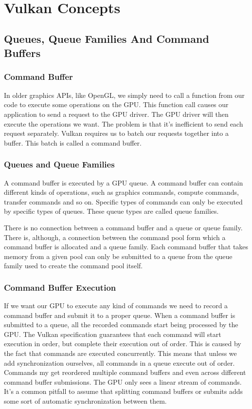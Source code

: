 \chapter{Vulkan Concepts}

\section{Queues, Queue Families And Command Buffers}

\subsection{Command Buffer}

In older graphics APIs, like OpenGL, we simply need to call a function
from our code to execute some operations on the GPU.
This function call causes our application to send a request to the GPU driver.
The GPU driver will then execute the operations we want.
The problem is that it's inefficient to send each request separately.
Vulkan requires us to batch our requests together into a buffer.
This batch is called a command buffer.

\subsection{Queues and Queue Families}

A command buffer is executed by a GPU queue.
A command buffer can contain different kinds of operations, such as graphics
commands, compute commands, transfer commands and so on.
Specific types of commands can only be executed by specific types of queues.
These queue types are called queue families.

There is no connection between a command buffer and a queue or queue family.
There is, although, a connection between the command pool form which a command
buffer is allocated and a queue family.
Each command buffer that takes memory from a given pool can only be submitted
to a queue from the queue family used to create the command pool itself.

\subsection{Command Buffer Execution}

If we want our GPU to execute any kind of commands we need to record a command
buffer and submit it to a proper queue.
When a command buffer is submitted to a queue, all the recorded commands start
being processed by the GPU.
The Vulkan specification guarantees that each command will start execution
in order, but complete their execution out of order.
This is caused by the fact that commands are executed concurrently.
This means that unless we add synchronization ourselves, all commands
in a queue execute out of order.
Commands my get reordered multiple command buffers and even across different
command buffer submissions.
The GPU only sees a linear stream of commands.
It's a common pitfall to assume that splitting command buffers or submits adds
some sort of automatic synchronization between them.

